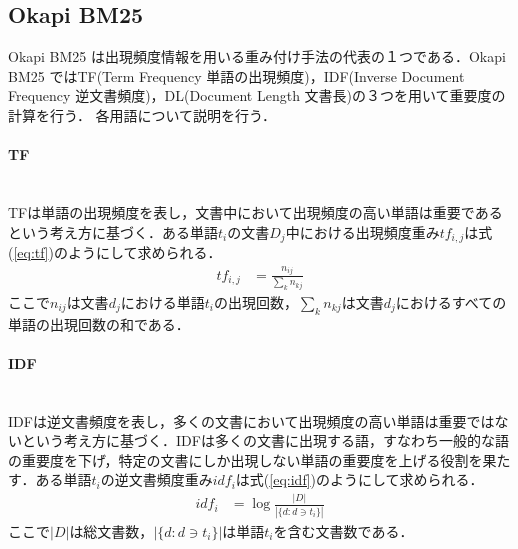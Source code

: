 \subsection{Okapi BM25}
Okapi BM25\cite{okapiBM25} は出現頻度情報を用いる重み付け手法の代表の１つである．Okapi BM25 ではTF(Term Frequency 単語の出現頻度)\cite{tf}，IDF(Inverse Document Frequency 逆文書頻度)\cite{idf}，DL(Document Length 文書長)の３つを用いて重要度の計算を行う．
各用語について説明を行う．
\paragraph{TF}\ \\
TFは単語の出現頻度を表し，文書中において出現頻度の高い単語は重要であるという考え方に基づく．ある単語$t_i$の文書$D_j$中における出現頻度重み$tf_{i,j}$は式(\ref{eq:tf})のようにして求められる．
\begin{equation}
\begin{aligned}
\label{eq:tf}
tf_{i,j} & = \frac{n_{ij}}{ \sum_{k} n_{kj} }
\end{aligned}
\end{equation}
ここで$n_{ij}$は文書$d_{j}$における単語$t_{i}$の出現回数，$\sum _{k} n_{kj} $は文書$d_{j}$におけるすべての単語の出現回数の和である．
\paragraph{IDF}\ \\
IDFは逆文書頻度を表し，多くの文書において出現頻度の高い単語は重要ではないという考え方に基づく．IDFは多くの文書に出現する語，すなわち一般的な語の重要度を下げ，特定の文書にしか出現しない単語の重要度を上げる役割を果たす．ある単語$t_i$の逆文書頻度重み$idf_{i}$は式(\ref{eq:idf})のようにして求められる．
\begin{equation}
\begin{aligned}
\label{eq:idf}
idf_{i} & = \log{ \frac{ |D| }{ | \{ d: d \ni t_i \}  |} } %
\end{aligned}
\end{equation}
ここで$|D|$は総文書数，$| \{ d: d \ni t_i \}  |$は単語$t_i$を含む文書数である．
